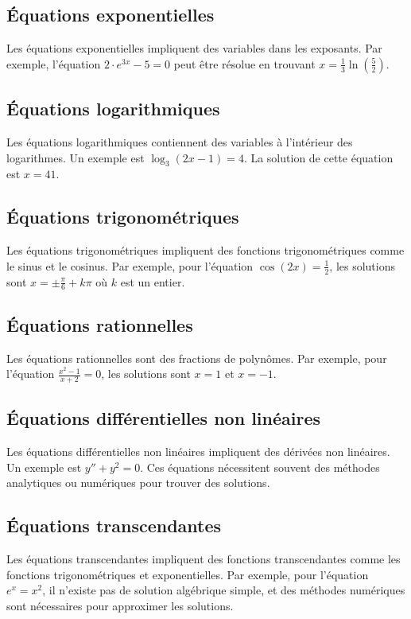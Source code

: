 \documentclass{article}
\begin{document}
\subsection{Équations exponentielles}
Les équations exponentielles impliquent des variables dans les exposants. Par exemple, l'équation $2 \cdot e^{3x} - 5 = 0$ peut être résolue en trouvant $x = \frac{1}{3} \ln\left(\frac{5}{2}\right)$.

\subsection{Équations logarithmiques}
Les équations logarithmiques contiennent des variables à l'intérieur des logarithmes. Un exemple est $\log_3(2x - 1) = 4$. La solution de cette équation est $x = 41$.

\subsection{Équations trigonométriques}
Les équations trigonométriques impliquent des fonctions trigonométriques comme le sinus et le cosinus. Par exemple, pour l'équation $\cos(2x) = \frac{1}{2}$, les solutions sont $x = \pm \frac{\pi}{6} + k\pi$ où $k$ est un entier.

\subsection{Équations rationnelles}
Les équations rationnelles sont des fractions de polynômes. Par exemple, pour l'équation $\frac{x^2 - 1}{x + 2} = 0$, les solutions sont $x = 1$ et $x = -1$.

\subsection{Équations différentielles non linéaires}
Les équations différentielles non linéaires impliquent des dérivées non linéaires. Un exemple est $y'' + y^2 = 0$. Ces équations nécessitent souvent des méthodes analytiques ou numériques pour trouver des solutions.

\subsection{Équations transcendantes}
Les équations transcendantes impliquent des fonctions transcendantes comme les fonctions trigonométriques et exponentielles. Par exemple, pour l'équation $e^x = x^2$, il n'existe pas de solution algébrique simple, et des méthodes numériques sont nécessaires pour approximer les solutions.
\end{document}
